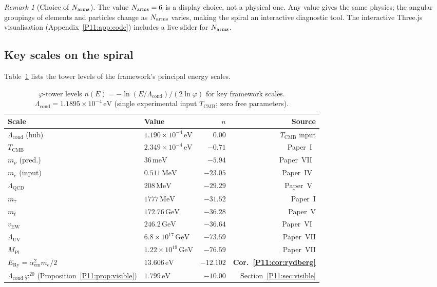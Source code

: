 \documentclass[11pt,a4paper]{article}
\theoremstyle{definition}
\theoremstyle{remark}
\newtheorem{remark}[theorem]{Remark}
\newcommand{\vp}{\varphi}
\newcommand{\TCMB}{T_{\mathrm{CMB}}}
\newcommand{\vEW}{v_{\mathrm{EW}}}
\newcommand{\Lcond}{\Lambda_{\mathrm{cond}}}
\newcommand{\LUV}{\Lambda_{\mathrm{UV}}}
\newcommand{\MPl}{M_{\mathrm{Pl}}}
\newcommand{\LQCD}{\Lambda_{\mathrm{QCD}}}
\newcommand{\ERy}{E_{\mathrm{Ry}}}
\newcommand{\aem}{\alpha_{\mathrm{em}}}
\begin{document}
\begin{remark}[Choice of $N_{\rm arms}$]
\label{P11:rem:Narms_choice}
The value $N_{\rm arms} = 6$ is a display choice, not a physical one.
Any value gives the same physics; the angular groupings of elements
and particles change as $N_{\rm arms}$ varies, making the spiral an
interactive diagnostic tool.  The interactive Three.js visualisation
(Appendix~\ref{P11:app:code}) includes a live slider for $N_{\rm arms}$.
\end{remark}

\subsection{Key scales on the spiral}

Table~\ref{P11:tab:levels} lists the tower levels of the framework's
principal energy scales.

\begin{table}[h]
\centering
\caption{$\vp$-tower levels $n(E) = -\ln(E/\Lcond)/(2\ln\vp)$
  for key framework scales.
  $\Lcond = 1.1895\times10^{-4}\,\mathrm{eV}$ (single experimental input
  $\TCMB$; zero free parameters).}
\label{P11:tab:levels}
\begin{tabular}{llrr}
\toprule
Scale & Value & $n$ & Source \\
\midrule
$\Lcond$ (hub)         & $1.190\times10^{-4}\,\mathrm{eV}$ & $0.00$   & $\TCMB$ input \\
$\TCMB$                & $2.349\times10^{-4}\,\mathrm{eV}$ & $-0.71$  & Paper~I~\cite{Paper1} \\
$m_\nu$ (pred.)        & $36\,\mathrm{meV}$                & $-5.94$  & Paper~VII~\cite{Paper7} \\
$m_e$ (input)          & $0.511\,\mathrm{MeV}$             & $-23.05$ & Paper~IV~\cite{Paper4} \\
$\LQCD$                & $208\,\mathrm{MeV}$               & $-29.29$ & Paper~V~\cite{Paper5} \\
$m_\tau$               & $1777\,\mathrm{MeV}$              & $-31.52$ & Paper~I \\
$m_t$                  & $172.76\,\mathrm{GeV}$            & $-36.28$ & Paper~V \\
$\vEW$                 & $246.2\,\mathrm{GeV}$             & $-36.64$ & Paper~VI~\cite{Paper6} \\
$\LUV$                 & $6.8\times10^{17}\,\mathrm{GeV}$  & $-73.59$ & Paper~VII \\
$\MPl$                 & $1.22\times10^{19}\,\mathrm{GeV}$ & $-76.59$ & Paper~VII \\
\midrule
$\ERy = \aem^2 m_e/2$  & $13.606\,\mathrm{eV}$             & $-12.102$ & \textbf{Cor.~\ref{P11:cor:rydberg}} \\
$\Lcond\,\vp^{20}$ (Proposition~\ref{P11:prop:visible})     & $1.799\,\mathrm{eV}$              & $-10.00$  & Section~\ref{P11:sec:visible} \\
\bottomrule
\end{tabular}
\end{table}
\end{document}

